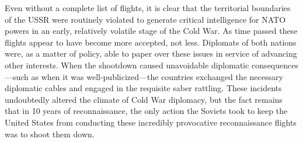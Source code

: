 \documentclass[14pt]{extarticle}
\begin{document}
Even without a complete list of flights, it is clear that the territorial boundaries of the USSR were routinely violated to generate critical intelligence for NATO powers in an early, relatively volatile stage of the Cold War. As time passed these flights appear to have become more accepted, not less. Diplomats of both nations were, as a matter of policy, able to paper over these issues in service of advancing other interests. When the shootdown caused unavoidable diplomatic consequences---such as when it was well-publicized---the countries exchanged the necessary diplomatic cables and engaged in the requisite saber rattling. These incidents undoubtedly altered the climate of Cold War diplomacy, but the fact remains that in 10 years of reconnaissance, the only action the Soviets took to keep the United States from conducting these incredibly provocative reconnaissance flights was to shoot them down.


\end{document}
